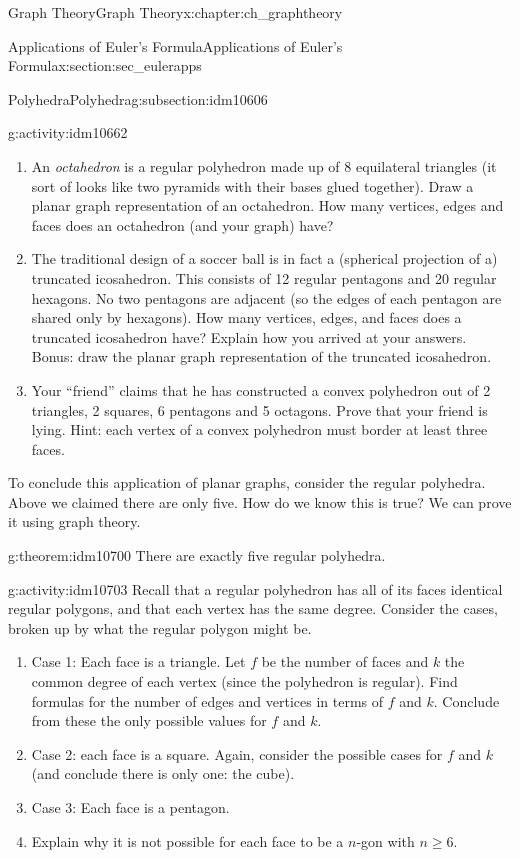 \documentclass[oneside,10pt,]{book}
\numberwithin{equation}{chapter}
\begin{document}
\begin{chapterptx}{Graph Theory}{}{Graph Theory}{}{}{x:chapter:ch_graphtheory}
\begin{sectionptx}{Applications of Euler's Formula}{}{Applications of Euler's Formula}{}{}{x:section:sec_eulerapps}
\begin{subsectionptx}{Polyhedra}{}{Polyhedra}{}{}{g:subsection:idm10606}
\begin{activity}{}{g:activity:idm10662}
\begin{enumerate}[font=\bfseries,label=(\alph*),ref=\alph*]
\item{}An \emph{octahedron} is a regular polyhedron made up of 8 equilateral triangles (it sort of looks like two pyramids with their bases glued together). Draw a planar graph representation of an octahedron. How many vertices, edges and faces does an octahedron (and your graph) have?%
\item{}The traditional design of a soccer ball is in fact a (spherical projection of a) truncated icosahedron. This consists of 12 regular pentagons and 20 regular hexagons. No two pentagons are adjacent (so the edges of each pentagon are shared only by hexagons). How many vertices, edges, and faces does a truncated icosahedron have? Explain how you arrived at your answers. Bonus: draw the planar graph representation of the truncated icosahedron.%
\item{}Your ``friend'' claims that he has constructed a convex polyhedron out of 2 triangles, 2 squares, 6 pentagons and 5 octagons. Prove that your friend is lying. Hint: each vertex of a convex polyhedron must border at least three faces.%
\end{enumerate}
\end{activity}
To conclude this application of planar graphs, consider the regular polyhedra. Above we claimed there are only five. How do we know this is true? We can prove it using graph theory.%
\begin{theorem}{}{}{g:theorem:idm10700}%
There are exactly five regular polyhedra.%
\end{theorem}
\begin{activity}{}{g:activity:idm10703}%
Recall that a regular polyhedron has all of its faces identical regular polygons, and that each vertex has the same degree. Consider the cases, broken up by what the regular polygon might be.%
\begin{enumerate}[font=\bfseries,label=(\alph*),ref=\alph*]
\item{}Case 1: Each face is a triangle.  Let \(f\) be the number of faces and \(k\) the common degree of each vertex (since the polyhedron is regular).  Find formulas for the number of edges and vertices in terms of \(f\) and \(k\).  Conclude from these the only possible values for \(f\) and \(k\).%
\item{}Case 2: each face is a square.  Again, consider the possible cases for \(f\) and \(k\) (and conclude there is only one: the cube).%
\item{}Case 3: Each face is a pentagon.%
\item{}Explain why it is not possible for each face to be a \(n\)-gon with \(n \ge 6\).%

\end{enumerate}
\end{activity}
\end{subsectionptx}
\end{sectionptx}
\end{chapterptx}
\end{document}
